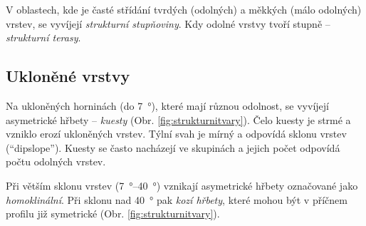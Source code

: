 V oblastech, kde je časté střídání tvrdých (odolných) a měkkých (málo odolných) vrstev, se vyvíjejí \emph{strukturní stupňoviny}. Kdy odolné vrstvy tvoří stupně -- \emph{strukturní terasy}.

\subsection{Ukloněné vrstvy}
Na ukloněných horninách (do \SI{7}{\degree}), které mají různou odolnost, se vyvíjejí asymetrické hřbety -- \emph{kuesty} (Obr. \ref{fig:strukturnitvary}). Čelo kuesty je strmé a vzniklo erozí ukloněných vrstev. Týlní svah je mírný a odpovídá sklonu vrstev (\enquote{dipslope}). Kuesty se často nacházejí ve skupinách a jejich počet odpovídá počtu odolných vrstev. 

Při větším sklonu vrstev (\SIrange{7}{40}{\degree}) vznikají asymetrické hřbety označované jako \emph{homoklinální}. Při sklonu nad \SI{40}{\degree} pak \emph{kozí hřbety}, které mohou být v příčnem profilu již symetrické (Obr. \ref{fig:strukturnitvary}).

